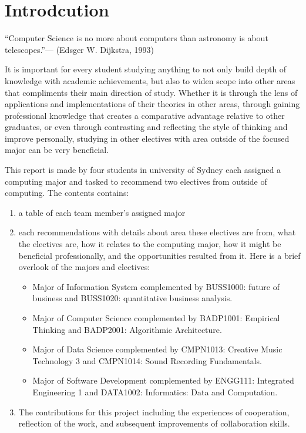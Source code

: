 \documentclass{article}
\begin{document}
\section{Introdcution}
	\begin{displayquote}
	“Computer Science is no more about computers than astronomy is about telescopes.”— (Edsger W. Dijkstra, 1993)
	\end{displayquote}
	It is important for every student studying anything to not only build depth of knowledge with academic achievements, but also to widen scope into other areas that compliments their main direction of study. Whether it is through the 	lens of applications and implementations of their theories in other areas, through gaining professional knowledge that creates a comparative advantage relative to other graduates, or even through contrasting and reflecting the style of thinking and improve personally, studying in other electives with area outside of the focused major can be very beneficial.\par
	This report is made by four students in university of Sydney each assigned a computing major and tasked to recommend two electives from outside of computing. The contents contains:
	\begin{enumerate}
		\item a table of each team member’s assigned major
		\item each recommendations with details about area these electives are from, what the electives are, how it relates to the computing major, how it might be beneficial professionally, and the opportunities resulted from it. Here is a brief overlook of the majors and electives:
		\begin{itemize}
			\item Major of Information System complemented by BUSS1000: future of business and BUSS1020: quantitative business analysis.
			\item Major of Computer Science complemented by BADP1001: Empirical Thinking and BADP2001: Algorithmic Architecture.
			\item Major of Data Science complemented by CMPN1013: Creative Music Technology 3 and CMPN1014: Sound Recording Fundamentals.
			\item Major of Software Development complemented by ENGG111: Integrated Engineering 1 and DATA1002: Informatics: Data and Computation.
		\end{itemize}
		\item The contributions for this project including the experiences of cooperation, reflection of the work, and subsequent improvements of collaboration skills.
	\end{enumerate}
\end{document}
